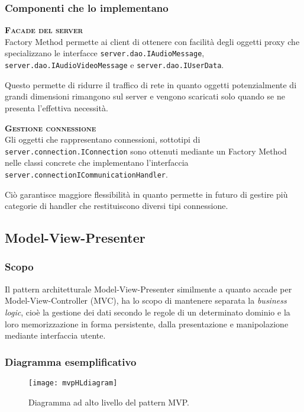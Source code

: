 \subsubsection{Componenti che lo implementano}
\begin{description}
  \item{\scshape\bfseries Facade del server}\\
Factory Method permette ai client di ottenere con facilità degli oggetti proxy che specializzano le interfacce \texttt{server.dao.IAudioMessage}, \texttt{server.dao.IAudioVideoMessage} e \texttt{server.dao.IUserData}.

Questo permette di ridurre il traffico di rete in quanto oggetti potenzialmente di grandi dimensioni rimangono sul server e vengono scaricati solo quando se ne presenta l'effettiva necessità.
  \item{\scshape\bfseries Gestione connessione}\\
Gli oggetti che rappresentano connessioni, sottotipi di \texttt{server.connection.IConnection} sono ottenuti mediante un Factory Method nelle classi concrete che implementano l'interfaccia \texttt{server.connectionICommunicationHandler}.

Ciò garantisce maggiore flessibilità in quanto permette in futuro di gestire più categorie di handler che restituiscono diversi tipi connessione.
\end{description}

\subsection{Model-View-Presenter}

\subsubsection{Scopo}
Il pattern architetturale \foreignlanguage{english}{Model-View-Presenter} similmente a quanto accade per \foreignlanguage{english}{Model-View-Controller} (MVC), ha lo scopo di mantenere separata la \textit{business logic}, cioè la gestione dei dati secondo le regole di un determinato dominio e la loro memorizzazione in forma persistente, dalla presentazione e manipolazione mediante interfaccia utente.

\subsubsection{Diagramma esemplificativo}
\begin{figure}[H]
\centering
\texttt{[image: mvpHLdiagram]}
\caption{Diagramma ad alto livello del pattern MVP.}\label{fig:mvpHL}
\end{figure}

